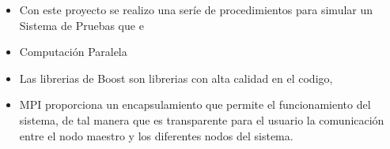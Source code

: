 \begin{itemize}

	\item Con este proyecto se realizo una seríe de procedimientos para simular un Sistema de Pruebas que e

	\item Computación Paralela

	\item Las librerias de Boost son librerias con alta calidad en el codigo, 

	\item MPI proporciona un encapsulamiento que permite el funcionamiento del sistema, de tal manera que es transparente para el usuario la comunicación entre el nodo maestro y los diferentes nodos del sistema.

\end{itemize}